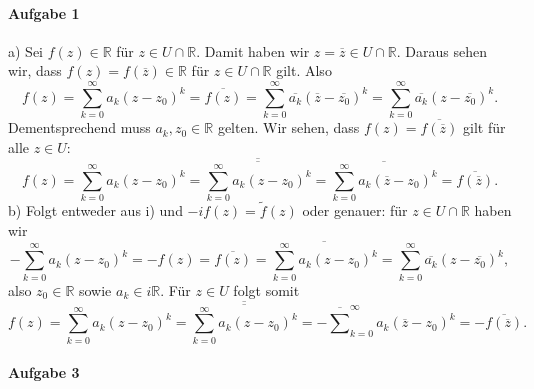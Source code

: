 \documentclass[11pt,a4paper]{article}
\theoremstyle{definition} \newtheorem{theo}{Theorem}[section]
\theoremstyle{definition} \newtheorem{defi}{Definition}[section]
\theoremstyle{definition} \newtheorem{cor}{Corollary}[section]
\theoremstyle{definition} \newtheorem{lemmas}{Lemma}[section]
\theoremstyle{definition} \newtheorem{assp}{Assumption}[section]
\theoremstyle{definition} \newtheorem{exam}{Example}[section]
\theoremstyle{definition} \newtheorem{sol}{Lösung}
\begin{document}
\paragraph{Aufgabe 1}
a) Sei $f(z)\in \mathbb{R}$ für $z\in U\cap \mathbb{R}$. Damit haben wir $z=\overline{z}\in U\cap \mathbb{R}$. Daraus sehen wir, dass $f(z)=f(\overline{z})\in \mathbb{R}$ für $z\in U\cap \mathbb{R}$ gilt. Also
\begin{equation*}
f(z)=\sum_{k=0}^{\infty}a_{k}(z-z_{0})^{k}=\overline{f(z)}=\sum_{k=0}^{\infty}\overline{a_{k}}(\overline{z}-\overline{z_{0}})^k=\sum_{k=0}^{\infty}\overline{a_{k}}(z-\overline{z_{0}})^k.
\end{equation*}
Dementsprechend muss $a_{k},z_{0}\in \mathbb{R}$ gelten. Wir sehen, dass $f(z)= \overline{f(\overline{z})}$ gilt für alle $z\in U$:
\begin{equation*}
f(z)=\sum_{k=0}^{\infty}a_{k}(z-z_{0})^{k}=\overline{\overline{\sum_{k=0}^{\infty}a_{k}(z-z_{0})^{k}}}=\overline{\sum_{k=0}^{\infty}a_{k}(\overline{z}-z_{0})^{k}}=\overline{f(\overline{z})}.
\end{equation*}
b) Folgt entweder aus i) und $-if(z)=\tilde{f}(z)$ oder genauer: für $z\in U\cap \mathbb{R}$ haben wir
\begin{equation*}
-\sum_{k=0}^{\infty}a_{k}(z-z_{0})^{k}=-f(z)=\overline{f(z)}=\overline{\sum_{k=0}^{\infty}a_{k}(z-z_{0})^{k}}= \sum_{k=0}^{\infty}\overline{a_{k}}(z-\overline{z_{0}})^{k},
\end{equation*}
also $z_{0}\in\mathbb{R}$ sowie $a_{k}\in i\mathbb{R}$. Für $z\in U$ folgt somit
\begin{equation*}
f(z)=\sum_{k=0}^{\infty}a_{k}(z-z_{0})^{k}=\overline{\overline{\sum_{k=0}^{\infty}a_{k}(z-z_{0})^{k}}}=-\overline \sum_{k=0}^{\infty}a_{k}(\overline{z}-z_{0})^{k}=-\overline{f(\overline{z})}.
\end{equation*}

\paragraph{Aufgabe 3}
\end{document}
